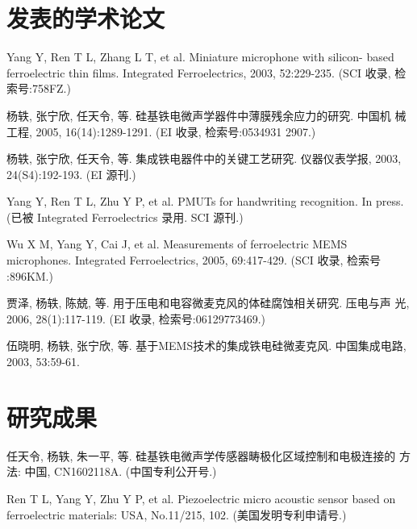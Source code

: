 \begin{resume}

  \section*{发表的学术论文} %

  \begin{enumerate}[{[}1{]}]
  \addtolength{\itemsep}{-.36\baselineskip}%
  \item Yang Y, Ren T L, Zhang L T, et al. Miniature microphone with silicon-
    based ferroelectric thin films. Integrated Ferroelectrics, 2003,
    52:229-235. (SCI 收录, 检索号:758FZ.)
  \item 杨轶, 张宁欣, 任天令, 等. 硅基铁电微声学器件中薄膜残余应力的研究. 中国机
    械工程, 2005, 16(14):1289-1291. (EI 收录, 检索号:0534931 2907.)
  \item 杨轶, 张宁欣, 任天令, 等. 集成铁电器件中的关键工艺研究. 仪器仪表学报,
    2003, 24(S4):192-193. (EI 源刊.)
  \item Yang Y, Ren T L, Zhu Y P, et al. PMUTs for handwriting recognition. In
    press. (已被 Integrated Ferroelectrics 录用. SCI 源刊.)
  \item Wu X M, Yang Y, Cai J, et al. Measurements of ferroelectric MEMS
    microphones. Integrated Ferroelectrics, 2005, 69:417-429. (SCI 收录, 检索号
    :896KM.)
  \item 贾泽, 杨轶, 陈兢, 等. 用于压电和电容微麦克风的体硅腐蚀相关研究. 压电与声
    光, 2006, 28(1):117-119. (EI 收录, 检索号:06129773469.)
  \item 伍晓明, 杨轶, 张宁欣, 等. 基于MEMS技术的集成铁电硅微麦克风. 中国集成电路, 
    2003, 53:59-61.
  \end{enumerate}

  \section*{研究成果} %
  \begin{enumerate}[{[}1{]}]
  \addtolength{\itemsep}{-.36\baselineskip}%
  \item 任天令, 杨轶, 朱一平, 等. 硅基铁电微声学传感器畴极化区域控制和电极连接的
    方法: 中国, CN1602118A. (中国专利公开号.)
  \item Ren T L, Yang Y, Zhu Y P, et al. Piezoelectric micro acoustic sensor
    based on ferroelectric materials: USA, No.11/215, 102. (美国发明专利申请号.)
  \end{enumerate}
\end{resume}
